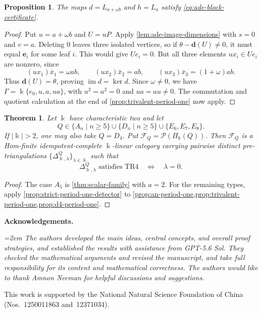\documentclass[a4paper,11pt,reqno]{amsart}
\newtheorem{theorem}{Theorem}[section]
\newtheorem{proposition}[proposition]{Proposition}
\theoremstyle{definition}
\theoremstyle{plain}
\numberwithin{equation}{section}
\newcommand{\im}{\operatorname{im}}
\newcommand{\kk}{\Bbbk}
\begin{document}
\begin{proposition}
\label{prop:d4-period-one}
The maps \(d=L_{a+\omega b}\) and \(h=L_a\) satisfy
\eqref{eq:ade-block-certificate}.
\end{proposition}

\begin{proof}
Put \(u=a+\omega b\) and \(U=uP\).  Apply
\cref{lem:ade-image-dimensions} with \(s=0\) and \(v=a\).
Deleting \(0\) leaves three isolated vertices, so if
\(\theta-\mathbf d(U)\ne0\), it must equal \(\mathbf e_i\)
for some leaf \(i\).  This would give \(Ue_i=0\).
But all three elements \(ux_i\in Ue_i\) are nonzero, since
\[
 (ux_1)\bar x_1=\omega ab,\qquad
 (ux_2)\bar x_2=ab,\qquad
 (ux_3)\bar x_3=(1+\omega)ab.
\]
Thus \(\mathbf d(U)=\theta\), proving \(\im d=\ker d\).
Since \(\omega\ne0\), we have
\(\Gamma=\kk\{e_0,u,a,ua\}\), with
\(u^2=a^2=0\) and \(ua=au\ne0\).
The commutation and quotient calculation at the end of
\cref{prop:trivalent-period-one} now apply.
\end{proof}

\begin{theorem}
\label{thm:ade-explicit-lines}
Let \(\kk\) have characteristic two and let
\[
 Q\in\{A_n\mid n\ge5\}\cup\{D_n\mid n\ge5\}
       \cup\{E_6,E_7,E_8\}.
\]
If \(|\kk|>2\), one may also take \(Q=D_4\).  Put
\(\mathcal F_Q=\mathcal P(\Pi_\kk(Q))\).  Then \(\mathcal F_Q\) is a
Hom-finite idempotent-complete \(\kk\)-linear category carrying pairwise
distinct pre-triangulations
\(\{\Delta^Q_{\kk,\lambda}\}_{\lambda\in\kk}\) such that
\[
 \Delta^Q_{\kk,\lambda}\text{ satisfies }\mathrm{TR4}
 \quad\Longleftrightarrow\quad
 \lambda=0.
\]
\end{theorem}

\begin{proof}
The case \(A_5\) is \cref{thm:scalar-family} with \(a=2\).
For the remaining types, apply \cref{prop:strict-period-one-detector}
to \cref{prop:an-period-one,prop:trivalent-period-one,prop:d4-period-one}.
\end{proof}

\medskip
\noindent\textbf{Acknowledgements.}
{\itshape\emergencystretch=2em
The authors developed the main ideas, central concepts, and overall proof
strategies, and established the results with assistance from GPT-5.6 Sol.
They checked the mathematical arguments and revised the manuscript, and
take full responsibility for its content and mathematical correctness.
The authors would like to thank Amnon Neeman for helpful discussions and
suggestions.

This work is supported by the National Natural Science Foundation of China
(Nos.~1250011863 and~12371034).
\par}
\end{document}
